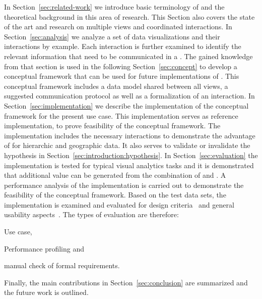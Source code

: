 In Section~\ref{sec:related-work} we introduce basic terminology of \cmvs{} and the theoretical background in this area of research.
This Section also covers the state of the art and research on multiple views and coordinated interactions.
In Section~\ref{sec:analysis} we analyze a set of data visualizations and their interactions by example.
Each interaction is further examined to identify the relevant information that need to be communicated in a \cmv{}.
The gained knowledge from that section is used in the following Section~\ref{sec:concept} to develop a conceptual framework that can be used for future implementations of \cmvs{}.
This conceptual framework includes a data model shared between all views, a suggested communication protocol as well as a formalization of an interaction.
In Section~\ref{sec:implementation} we describe the implementation of the conceptual framework for the present use case.
This implementation serves as reference implementation, to prove feasibility of the conceptual framework.
The implementation includes the necessary interactions to demonstrate the advantage of \cmvs{} for hierarchic and geographic data.
It also serves to validate or invalidate the hypothesis in Section~\ref{sec:introduction:hypothesis}.
In Section~\ref{sec:evaluation} the implementation is tested for typical visual analytics tasks and it is demonstrated that additional value can be generated from the combination of \tmap{} and \gv{}.
A performance analysis of the implementation is carried out to demonstrate the feasibility of the conceptual framework.
Based on the test data sets, the \cmv{} implementation is examined and evaluated for design criteria~\cite{Baldonado2000} and general usability aspects~\cite{Roberts2007}.
The types of evaluation are therefore:

\begin{enumerate*}[label=(\arabic*)]
  \item Use case,
  \item Performance profiling and
  \item manual check of formal requirements.
\end{enumerate*}

Finally, the main contributions in Section~\ref{sec:conclusion} are summarized and the future work is outlined.


